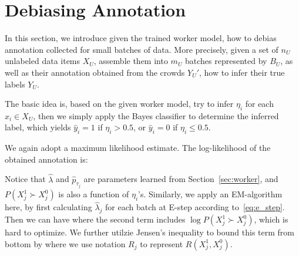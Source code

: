 \section{Debiasing Annotation}
\label{sec:debias}

In this section, we introduce given the trained worker model, 
how to debias annotation collected for small batches of data.  
More precisely, given a set of $n_U$ unlabeled data items $X_U$,
assemble them into $m_U$ batches represented by $B_U$,  
as well as their annotation obtained from the crowds $Y_U'$,
how to infer their true labels $Y_U$.  

The basic idea is, based on the given worker model,
try to infer $\eta_i$ for each $x_i \in X_U$,
then we simply apply the Bayes classifier to determine the inferred label, 
which yields $\hat{y}_i = 1$ if $\eta_i > 0.5$, or $\hat{y}_i = 0$ if $\eta_i \leq 0.5$.  

We again adopt a maximum likelihood estimate.  
The log-likelihood of the obtained annotation is:
%

Notice that $\hat{\lambda}$ and $\hat{p}_{\tau_j}$ are parameters learned from Section~\ref{sec:worker},
and $P(X_{j}^1 \succ X_{j}^0)$ is also a function of $\eta_{i}$'s.  
Similarly, we apply an EM-algorithm here, 
by first calculating $\hat{\lambda}_j$ for each batch at E-step according to~\eqref{eq:e_step}.  
Then we can have
%
where the second term includes $\log P(X_{j}^1 \succ X_{j}^0)$, which is hard to optimize.  
We further utilzie Jensen's inequality to bound this term from bottom by
%
where we use notation $R_j$ to represent $R(X_{j}^1, X_{j}^0)$.  

